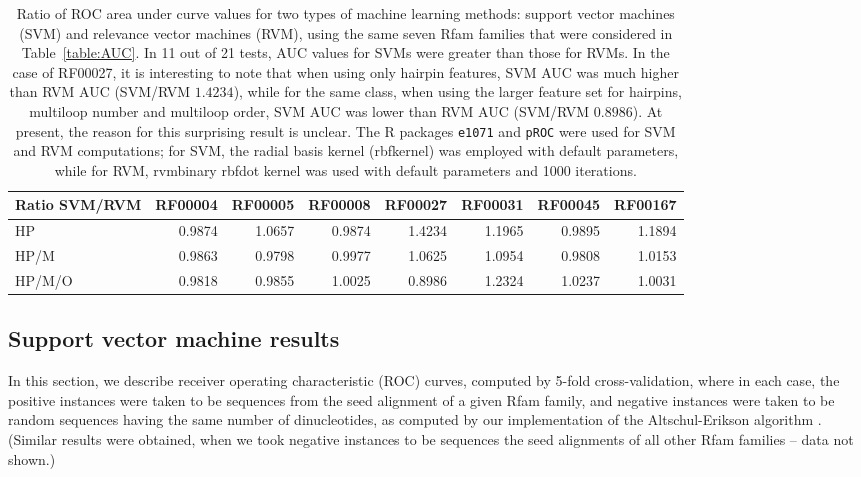 \begin{table*}
\begin{tabular}{|l|rrrrrrr|}
\hline
Ratio SVM/RVM &RF00004& RF00005& RF00008& RF00027& RF00031& RF00045& RF00167\\
\hline
HP&      0.9874&  1.0657&  0.9874&  1.4234&  1.1965&  0.9895&  1.1894\\
HP/M&    0.9863&  0.9798&  0.9977&  1.0625&  1.0954&  0.9808&  1.0153\\
HP/M/O&  0.9818&  0.9855&  1.0025&  0.8986&  1.2324&  1.0237&  1.0031\\
\hline
\end{tabular}
\caption{Ratio of ROC area under curve values for two types of machine
learning methods: support vector machines (SVM) and relevance vector
machines (RVM), using the same seven Rfam families that were considered
in Table~\ref{table:AUC}. In 11 out of 21 tests, AUC values for SVMs
were greater than those for RVMs. In the case of RF00027, it is interesting
to note that when using only hairpin features, SVM AUC was much higher than
RVM AUC (SVM/RVM $1.4234$), while for the same class, when using the larger
feature set for hairpins, multiloop number and multiloop order, SVM AUC
was lower than RVM AUC (SVM/RVM $0.8986$). At present, the reason for
this surprising result is unclear.
The R packages {\tt e1071} \cite{RpackageForSVM} and {\tt pROC} \cite{pROC}
were used for SVM and RVM computations;
for SVM, the radial basis kernel (rbfkernel) was employed with
default parameters, while for RVM, rvmbinary
rbfdot kernel was used with default parameters and 1000 iterations.
}
\label{table:RF00027aucSVMversusRVM}
\end{table*}

\subsection{Support vector machine results}

In this section, we describe receiver operating characteristic
(ROC) curves, computed by 5-fold cross-validation, where in each
case, the positive instances were taken to be sequences from the
seed alignment of a given Rfam family, and negative instances were
taken to be random sequences having the same number of dinucleotides,
as computed by our implementation of the Altschul-Erikson algorithm
\cite{altschulErikson:dinucleotideShuffle}.
(Similar results were obtained, when we took negative instances to be
sequences the seed alignments of all other Rfam families -- data not
shown.)

